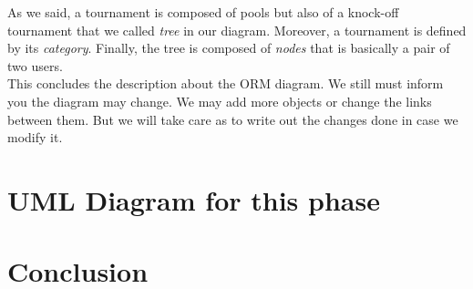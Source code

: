 \documentclass[a4paper, 12pt]{article}
\begin{document}
 As we said, a tournament is composed of pools but also of a knock-off tournament that we called \textit{tree} in our diagram. Moreover, a tournament is defined by its \textit{category}. Finally, the tree is composed of \textit{nodes} that is basically a pair of two users. \\
 
 This concludes the description about the ORM diagram. We still must inform you the diagram may change. We may add more objects or change the links between them. But we will take care as to write out the changes done in case we modify it.
 


\newpage
\section{UML Diagram for this phase}


\section{Conclusion}
\end{document}
